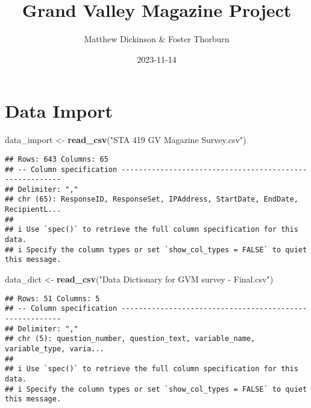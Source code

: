 \documentclass[
]{article}
\title{Grand Valley Magazine Project}
\author{Matthew Dickinson \& Foster Thorburn}
\date{2023-11-14}
\newenvironment{Shaded}{\begin{snugshade}}{\end{snugshade}}
\newcommand{\DecValTok}[1]{\textcolor[rgb]{0.00,0.00,0.81}{#1}}
\newcommand{\FunctionTok}[1]{\textcolor[rgb]{0.13,0.29,0.53}{\textbf{#1}}}
\newcommand{\NormalTok}[1]{#1}
\newcommand{\OtherTok}[1]{\textcolor[rgb]{0.56,0.35,0.01}{#1}}
\newcommand{\SpecialCharTok}[1]{\textcolor[rgb]{0.81,0.36,0.00}{\textbf{#1}}}
\newcommand{\StringTok}[1]{\textcolor[rgb]{0.31,0.60,0.02}{#1}}
\begin{document}
\maketitle

\hypertarget{data-import}{%
\section{Data Import}\label{data-import}}

\begin{Shaded}
\begin{Highlighting}[]
\NormalTok{data\_import }\OtherTok{\textless{}{-}} \FunctionTok{read\_csv}\NormalTok{(}\StringTok{"STA 419 GV Magazine Survey.csv"}\NormalTok{)}
\end{Highlighting}
\end{Shaded}

\begin{verbatim}
## Rows: 643 Columns: 65
## -- Column specification --------------------------------------------------------
## Delimiter: ","
## chr (65): ResponseID, ResponseSet, IPAddress, StartDate, EndDate, RecipientL...
## 
## i Use `spec()` to retrieve the full column specification for this data.
## i Specify the column types or set `show_col_types = FALSE` to quiet this message.
\end{verbatim}

\begin{Shaded}
\begin{Highlighting}[]
\NormalTok{data\_dict }\OtherTok{\textless{}{-}} \FunctionTok{read\_csv}\NormalTok{(}\StringTok{"Data Dictionary for GVM survey {-} Final.csv"}\NormalTok{)}
\end{Highlighting}
\end{Shaded}

\begin{verbatim}
## Rows: 51 Columns: 5
## -- Column specification --------------------------------------------------------
## Delimiter: ","
## chr (5): question_number, question_text, variable_name, variable_type, varia...
## 
## i Use `spec()` to retrieve the full column specification for this data.
## i Specify the column types or set `show_col_types = FALSE` to quiet this message.
\end{verbatim}

\begin{Shaded}
\end{Shaded}
\end{document}
